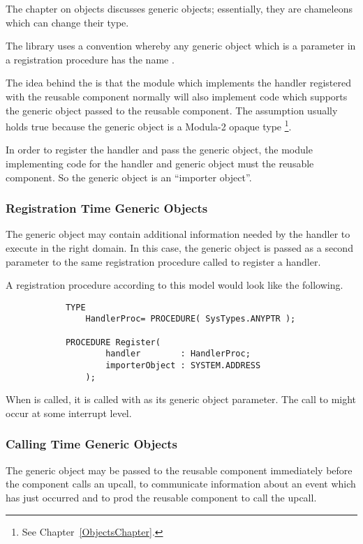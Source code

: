 The chapter on objects discusses generic objects; essentially, they are
chameleons which can change their type.

The library uses a convention whereby any generic object which is a parameter
in a registration procedure has the name . 

The idea behind the  is that the module which implements
the handler registered with
the reusable component normally will also implement code which supports the
generic object passed to the reusable component.  The assumption usually
holds true because the generic object is a Modula-2 opaque type%
\footnote{See Chapter~\ref{ObjectsChapter}.}.

In order to register the handler and pass the generic object,
the module implementing code for the handler and generic object must
 the reusable component.  So the generic object is an ``importer
object''.


\subsubsection{Registration Time Generic Objects}

The generic object may contain additional information needed by the handler
to execute in the right domain.  In this case, the generic object
is passed as a second
parameter to the same registration procedure called to register a handler.

A registration procedure according to this model would look like the following.
\begin{verbatim}
            TYPE
                HandlerProc= PROCEDURE( SysTypes.ANYPTR );

            PROCEDURE Register( 
                    handler        : HandlerProc;
                    importerObject : SYSTEM.ADDRESS 
                );
\end{verbatim}

When  is called, it is called with 
as its generic object parameter.  The call to  might 
occur at some interrupt level.

\subsubsection{Calling Time Generic Objects}

The generic object may be passed to the reusable component immediately before 
the component calls an upcall, to communicate information about an event 
which has just
occurred and to prod the reusable component to call the upcall.

